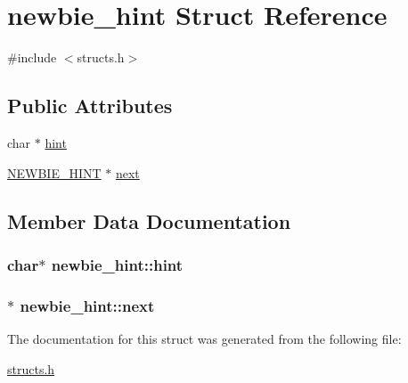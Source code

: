\hypertarget{structnewbie__hint}{\section{newbie\-\_\-hint Struct Reference}
\label{structnewbie__hint}
}


{\ttfamily \#include $<$structs.\-h$>$}

\subsection*{Public Attributes}
\begin{DoxyCompactItemize}
\item 
char $\ast$ \hyperlink{structnewbie__hint_a1712565669c79b17ea165ed6225299a0}{hint}
\item 
\hyperlink{structs_8h_ad4ad10783dde8fd0183e2d5b9c57d9a4}{N\-E\-W\-B\-I\-E\-\_\-\-H\-I\-N\-T} $\ast$ \hyperlink{structnewbie__hint_ae8ca1bd6c396aa1d3614fde9d8043945}{next}
\end{DoxyCompactItemize}


\subsection{Member Data Documentation}
\hypertarget{structnewbie__hint_a1712565669c79b17ea165ed6225299a0}{
\subsubsection[{hint}]{\setlength{\rightskip}{0pt plus 5cm}char$\ast$ newbie\-\_\-hint\-::hint}}\label{structnewbie__hint_a1712565669c79b17ea165ed6225299a0}
\hypertarget{structnewbie__hint_ae8ca1bd6c396aa1d3614fde9d8043945}{
\subsubsection[{next}]{$\ast$ newbie\-\_\-hint\-::next}}\label{structnewbie__hint_ae8ca1bd6c396aa1d3614fde9d8043945}


The documentation for this struct was generated from the following file\-:\begin{DoxyCompactItemize}
\item 
\hyperlink{structs_8h}{structs.\-h}\end{DoxyCompactItemize}
